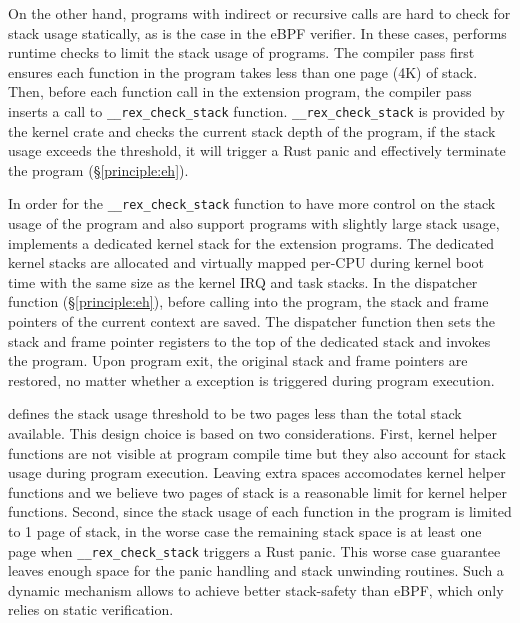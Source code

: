 On the other hand, programs with indirect or recursive calls are hard to check
    for stack usage statically, as is the case in the eBPF verifier.
In these cases, \projname{} performs runtime checks to limit the stack usage of
    programs.
The \projname{} compiler pass first ensures each function in the program takes
    less than one page (4K) of stack.
Then, before each function call in the extension program, the \projname{}
    compiler pass inserts a call to \texttt{\_\_rex\_check\_stack} function.
\texttt{\_\_rex\_check\_stack} is provided by the kernel crate and checks the
    current stack depth of the program, if the stack usage exceeds the
    threshold, it will trigger a Rust panic and effectively terminate the
    program (\S\ref{principle:eh}).

In order for the \texttt{\_\_rex\_check\_stack} function to have more control
    on the stack usage of the program and also support programs with slightly
    large stack usage, \projname{} implements a dedicated kernel stack for the
    extension programs.
The dedicated kernel stacks are allocated and virtually mapped per-CPU during
    kernel boot time with the same size as the kernel IRQ and task stacks.
In the dispatcher function (\S\ref{principle:eh}), before calling into the
    \projname{} program, the stack and frame pointers of the current context
    are saved.
The dispatcher function then sets the stack and frame pointer registers to the
    top of the dedicated stack and invokes the program.
Upon program exit, the original stack and frame pointers are restored, no
    matter whether a exception is triggered during program execution.

\projname{} defines the stack usage threshold to be two pages less than the
    total stack available.
This design choice is based on two considerations.
First, kernel helper functions are not visible at program compile time but they
    also account for stack usage during program execution.
Leaving extra spaces accomodates kernel helper functions and we believe two
    pages of stack is a reasonable limit for kernel helper functions.
Second, since the stack usage of each function in the program is limited to
    1 page of stack, in the worse case the remaining stack space is at least
    one page when \texttt{\_\_rex\_check\_stack} triggers a Rust panic.
This worse case guarantee leaves enough space for the panic handling and stack
    unwinding routines.
Such a dynamic mechanism allows \projname{} to achieve better stack-safety than
    eBPF, which only relies on static verification.

